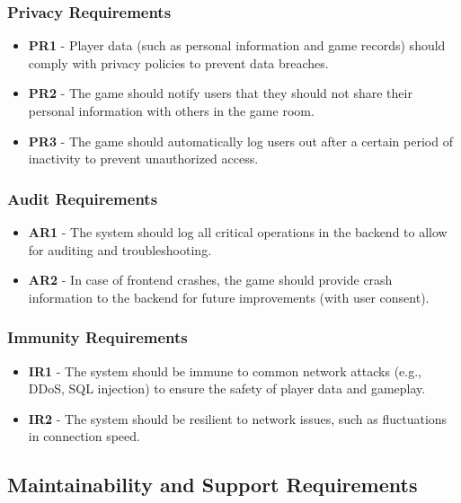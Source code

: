 \documentclass[12pt, titlepage]{article}
\begin{document}
\subsubsection{Privacy Requirements}
\begin{itemize}
    \item \textbf{PR1} - Player data (such as personal information and game records) should comply with privacy policies to prevent data breaches.
    \item \textbf{PR2} - The game should notify users that they should not share their personal information with others in the game room.
    \item \textbf{PR3} - The game should automatically log users out after a certain period of inactivity to prevent unauthorized access.
\end{itemize}

\subsubsection{Audit Requirements}
\begin{itemize}
    \item \textbf{AR1} - The system should log all critical operations in the backend to allow for auditing and troubleshooting.
    \item \textbf{AR2} - In case of frontend crashes, the game should provide crash information to the backend for future improvements (with user consent).
\end{itemize}

\subsubsection{Immunity Requirements}
\begin{itemize}
    \item \textbf{IR1} - The system should be immune to common network attacks (e.g., DDoS, SQL injection) to ensure the safety of player data and gameplay.
    \item \textbf{IR2} - The system should be resilient to network issues, such as fluctuations in connection speed.
\end{itemize}


\subsection{Maintainability and Support Requirements}
\end{document}
